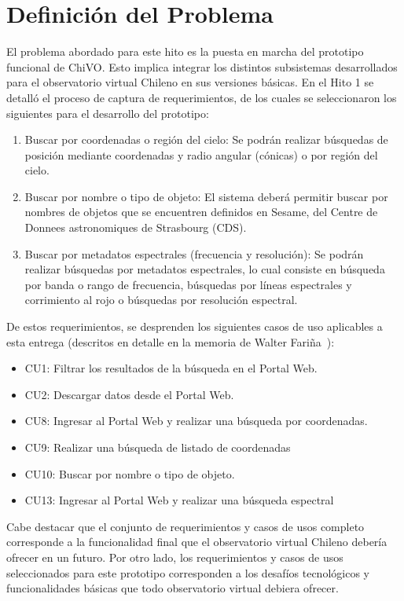 \section{Definición del Problema}

El problema abordado para este hito es la puesta en marcha
del prototipo funcional de ChiVO. Esto implica integrar los
distintos subsistemas desarrollados para el observatorio
virtual Chileno en sus versiones básicas. En el Hito 1 
se detalló el proceso de captura de requerimientos, de 
los cuales se seleccionaron los siguientes para el 
desarrollo del prototipo:

\begin{enumerate}
\item Buscar por coordenadas o región del cielo:
Se podrán realizar búsquedas de posición mediante coordenadas y radio angular
(cónicas) o por región del cielo.
\item Buscar por nombre o tipo de objeto:
El sistema deberá permitir buscar por nombres de objetos que se encuentren
definidos en Sesame, del Centre de Donnees astronomiques de Strasbourg (CDS).
\item Buscar por metadatos espectrales (frecuencia y resolución): 
Se podrán realizar búsquedas por metadatos espectrales, lo cual consiste en
búsqueda por banda o rango de frecuencia, búsquedas por líneas espectrales y 
corrimiento al rojo o búsquedas por resolución espectral.
\end{enumerate}

De estos requerimientos, se desprenden los siguientes casos 
de uso aplicables a esta entrega
(descritos en detalle en la memoria de Walter Fariña~\cite{}):
\begin{itemize}
\item CU1: Filtrar los resultados de la búsqueda en el Portal Web.
\item CU2: Descargar datos desde el Portal Web.
\item CU8: Ingresar al Portal Web y realizar una búsqueda por coordenadas.
\item CU9: Realizar una búsqueda de listado de coordenadas
\item CU10: Buscar por nombre o tipo de objeto.
\item CU13: Ingresar al Portal Web y realizar una búsqueda espectral
\end{itemize}

Cabe destacar que el conjunto de requerimientos y casos de usos completo
corresponde a la funcionalidad final que el observatorio virtual Chileno
debería ofrecer en un futuro. Por otro lado, los requerimientos y casos de usos seleccionados
para este prototipo corresponden a los desafíos tecnológicos y funcionalidades
básicas que todo observatorio virtual debiera ofrecer.

